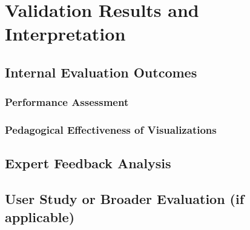 \section{Validation Results and Interpretation}

\subsection{Internal Evaluation Outcomes}

\subsubsection{Performance Assessment}

\subsubsection{Pedagogical Effectiveness of Visualizations}

\subsection{Expert Feedback Analysis}

\subsection{User Study or Broader Evaluation (if applicable)}

